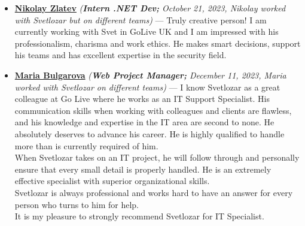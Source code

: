\documentclass[a4paper, 10pt]{article}
\begin{document}
\begin{itemize}
	\item \textbf{\href{https://www.linkedin.com/in/nikolay-zlatev/}{Nikolay
			Zlatev}} \textit{(\textbf{Intern .NET Dev;} October 21, 2023, Nikolay worked with Svetlozar but on different teams)} — Truly creative person! I am currently working with Svet in GoLive
	UK and I am impressed with his professionalism, charisma and work ethics. He
	makes smart decisions, support his teams and has excellent expertise in
	the security field.
	
	\item \textbf{\href{https://www.linkedin.com/in/maria-bulgarova-15476b32/}{Maria
			Bulgarova}} \textit{(\textbf{Web Project Manager;} December 11, 2023, Maria  worked with Svetlozar on different teams)} — I know Svetlozar as a great colleague at Go Live where he works as an IT Support Specialist. His communication skills when working with colleagues and clients are flawless, and his knowledge and expertise in the IT area are second to none. He absolutely deserves to advance his career. He is highly qualified to handle more than is currently required of him.\\
	When Svetlozar takes on an IT project, he will follow through and personally ensure that every small detail is properly handled. He is an extremely effective specialist with superior organizational skills.\\
	Svetlozar is always professional and works hard to have an answer for every person who turns to him for help.\\
	It is my pleasure to strongly recommend Svetlozar for IT Specialist.
\end{itemize}
\fi
\end{document}
